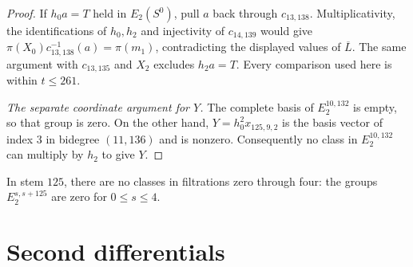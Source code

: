 \begin{proof}
If $h_0a=T$ held in $E_2(S^0)$, pull $a$ back through
$c_{13,138}$. Multiplicativity, the identifications of $h_0,h_2$ and
injectivity of $c_{14,139}$ would give
$\pi(X_0)c_{13,138}^{-1}(a)=\pi(m_1)$, contradicting the displayed
values of $\overline L$. The same argument with $c_{13,135}$ and $X_2$
excludes $h_2a=T$. Every comparison used here is within $t\leq261$.

\textit{The separate coordinate argument for $Y$.}
The complete basis of $E_2^{10,132}$ is empty, so that group is zero.
On the other hand, $Y=h_0^2x_{125,9,2}$ is the basis vector of index $3$
in bidegree $(11,136)$ and is nonzero. Consequently no class in
$E_2^{10,132}$ can multiply by $h_2$ to give $Y$.

\end{proof}


\begin{theorem}
\label{sem:Computation:vanishing-regions}
In stem $125$, there are no classes in filtrations zero through four:
the groups $E_2^{s,s+125}$ are zero for $0\leq s\leq4$.
\end{theorem}

\section{Second differentials}


